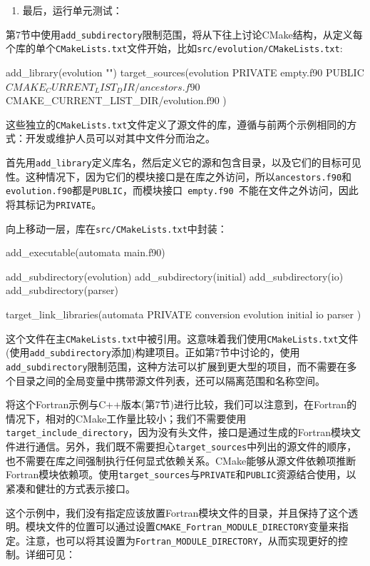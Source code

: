 \begin{enumerate}
\item 最后，运行单元测试：


\end{enumerate}


第7节中使用\texttt{add\_subdirectory}限制范围，将从下往上讨论CMake结构，从定义每个库的单个\texttt{CMakeLists.txt}文件开始，比如\texttt{src/evolution/CMakeLists.txt}:

\begin{codebox}[cmake]
add_library(evolution "")
target_sources(evolution
  PRIVATE
    empty.f90
  PUBLIC
    ${CMAKE_CURRENT_LIST_DIR}/ancestors.f90
    ${CMAKE_CURRENT_LIST_DIR}/evolution.f90
  )
\end{codebox}

这些独立的\texttt{CMakeLists.txt}文件定义了源文件的库，遵循与前两个示例相同的方式：开发或维护人员可以对其中文件分而治之。

首先用\texttt{add\_library}定义库名，然后定义它的源和包含目录，以及它们的目标可见性。这种情况下，因为它们的模块接口是在库之外访问，所以\texttt{ancestors.f90}和\texttt{ evolution.f90}都是\texttt{PUBLIC}，而模块接口\texttt{ empty.f90 }不能在文件之外访问，因此将其标记为\texttt{PRIVATE}。

向上移动一层，库在\texttt{src/CMakeLists.txt}中封装：

\begin{codebox}[cmake]
add_executable(automata main.f90)

add_subdirectory(evolution)
add_subdirectory(initial)
add_subdirectory(io)
add_subdirectory(parser)

target_link_libraries(automata
  PRIVATE
    conversion
    evolution
    initial
    io
    parser
  )
\end{codebox}

这个文件在主\texttt{CMakeLists.txt}中被引用。这意味着我们使用\texttt{CMakeLists.txt}文件(使用\texttt{add\_subdirectory}添加)构建项目。正如第7节中讨论的，使用\texttt{add\_subdirectory}限制范围，这种方法可以扩展到更大型的项目，而不需要在多个目录之间的全局变量中携带源文件列表，还可以隔离范围和名称空间。

将这个Fortran示例与C++版本(第7节)进行比较，我们可以注意到，在Fortran的情况下，相对的CMake工作量比较小；我们不需要使用\texttt{target\_include\_directory}，因为没有头文件，接口是通过生成的Fortran模块文件进行通信。另外，我们既不需要担心\texttt{target\_sources}中列出的源文件的顺序，也不需要在库之间强制执行任何显式依赖关系。CMake能够从源文件依赖项推断Fortran模块依赖项。使用\texttt{target\_sources}与\texttt{PRIVATE}和\texttt{PUBLIC}资源结合使用，以紧凑和健壮的方式表示接口。


这个示例中，我们没有指定应该放置Fortran模块文件的目录，并且保持了这个透明。模块文件的位置可以通过设置\texttt{CMAKE\_Fortran\_MODULE\_DIRECTORY}变量来指定。注意，也可以将其设置为\texttt{Fortran\_MODULE\_DIRECTORY}，从而实现更好的控制。详细可见：


